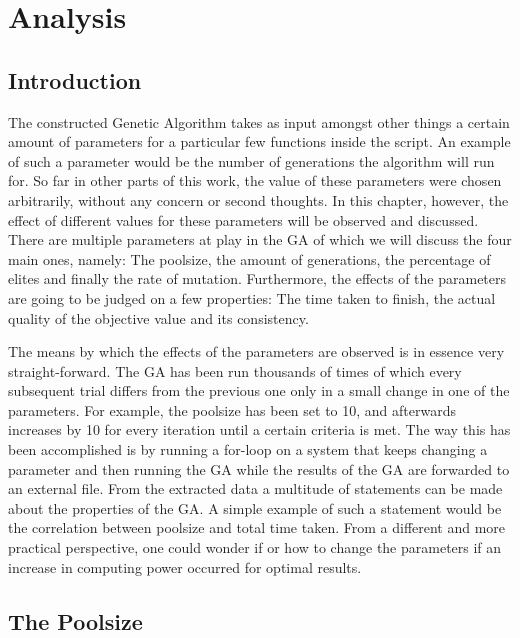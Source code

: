 \chapter{Analysis}
\section{Introduction}

\par
The constructed Genetic Algorithm takes as input amongst other things a certain amount of parameters for a particular few functions inside the script. An example of such a parameter would be the number of generations the algorithm will run for. So far in other parts of this work, the value of these parameters were chosen arbitrarily, without any concern or second thoughts. In this chapter, however, the effect of different values for these parameters will be observed and discussed. 
There are multiple parameters at play in the GA of which we will discuss the four main ones, namely: The poolsize, the amount of generations, the percentage of elites and finally the rate of mutation. Furthermore, the effects of the parameters are going to be judged on a few properties: The time taken to finish, the actual quality of the objective value and its consistency.
\par
\vspace{5mm}

The means by which the effects of the parameters are observed is in essence very straight-forward. The GA has been run thousands of times of which every subsequent trial differs from the previous one only in a small change in one of the parameters.
For example, the poolsize has been set to 10, and afterwards increases by 10 for every iteration until a certain criteria is met. The way this has been accomplished is by running a for-loop on a system that keeps changing a parameter and then running the GA while the results of the GA are forwarded to an external file.
From the extracted data a multitude of statements can be made about the properties of the GA. A simple example of such a statement would be the correlation between poolsize and total time taken. From a different and more practical perspective, one could wonder if or how to change the parameters if an increase in computing power occurred for optimal results.


\section{The Poolsize}

